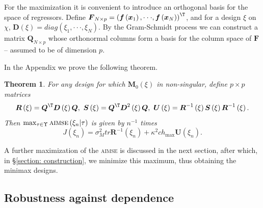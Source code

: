 \documentclass[times, authoryear, 12pt, twoside]{elsarticle}
\newtheorem{theorem}{Theorem}
\begin{document}
For the maximization it is convenient to introduce an
orthogonal basis for the space of regressors. Define $\boldsymbol{F}%
_{N\times p}=\left( \boldsymbol{f}\left( \boldsymbol{x}_{1}\right) ,\cdot
\cdot \cdot ,\boldsymbol{f}\left( \boldsymbol{x}_{N}\right) \right) ^{\T
}$, and for a design $\xi $ on $\chi $, $\boldsymbol{D}\left( \xi \right)
=diag\left( \xi _{1},\cdot \cdot \cdot ,\xi _{N}\right) $. By the
Gram-Schmidt process we can construct a matrix $\boldsymbol{Q}_{N\times p}$
whose orthonormal columns form a basis for the column space of $\boldsymbol{F%
}$ -- assumed to be of dimension $p$.

In the Appendix we prove the following theorem.

\begin{theorem}
\label{thm: max loss} For any design for which $\boldsymbol{M}_{0}\left( \xi \right)$ in non-singular, define $p\times p$ matrices 
\begin{equation*}
\boldsymbol{R}\left( \xi \right) =\boldsymbol{Q}^{\T }\boldsymbol{D}%
\left( \xi \right) \boldsymbol{Q},\text{ }\boldsymbol{S}\left( \xi \right) =%
\boldsymbol{Q}^{\T }\boldsymbol{D}^{2}\left( \xi \right) \boldsymbol{Q},%
\text{ }\boldsymbol{U}\left( \xi \right) =\boldsymbol{R}^{-1}\left( \xi
\right) \boldsymbol{S}\left( \xi \right) \boldsymbol{R}^{-1}\left( \xi
\right) .
\end{equation*}%
Then $\max_{\tau \in \Upsilon } \textsc{aimse} \left( \xi _{n}|\tau \right) $
is given by $n^{-1}$ times 
\begin{equation}
J\left( \xi _{n}\right) =\sigma _{M}^{2}tr\boldsymbol{R}^{-1}\left( \xi
_{n}\right) +\kappa ^{2}ch_{\max }\boldsymbol{U}\left( \xi _{n}\right) .
\label{I3}
\end{equation}
\end{theorem}

A further maximization of the \textsc{aimse} is discussed in the next
section, after which, in \S \ref{section: construction}, we minimize this
maximum, thus obtaining the minimax designs.

\subsection{Robustness against dependence \label{section: dependence}}
\end{document}
